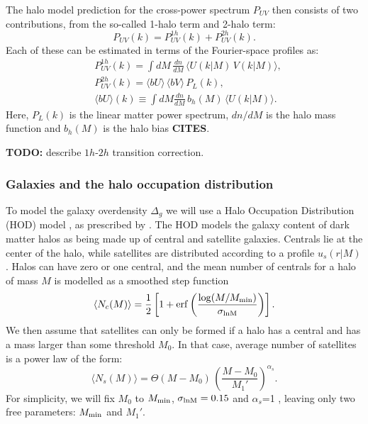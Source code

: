 \documentclass[useAMS,usenatbib]{mn2e}
\newcommand{\cites}{{\bf CITES}}
\newcommand{\todo}[1]{{\bf TODO:} #1}
\begin{document}
    The halo model prediction for the cross-power spectrum $P_{UV}$ then consists of two contributions, from the so-called 1-halo term and 2-halo term:
    \begin{equation}
      P_{UV}(k)=P^{1h}_{UV}(k)+P^{2h}_{UV}(k).
    \end{equation}
    Each of these can be estimated in terms of the Fourier-space profiles as:
    \begin{align}
      &P^{1h}_{UV}(k)=\int dM\,\frac{dn}{dM}\,\langle U(k|M)\,V(k|M)\rangle,\\
      &P^{2h}_{UV}(k)=\langle bU\rangle\,\langle bV\rangle\,P_L(k),\\
      &\langle bU\rangle(k)\equiv\int dM\frac{dn}{dM}\,b_h(M)\,\langle U(k|M)\rangle. \label{eq:hm_bias}
    \end{align}
    Here, $P_L(k)$ is the linear matter power spectrum, $dn/dM$ is the halo mass function and $b_h(M)$ is the halo bias \cites. %
    
    \todo{describe $1h$-$2h$ transition correction.}
    
    \subsubsection{Galaxies and the halo occupation distribution}\label{sssec:theory.hm.hod}
      To model the galaxy overdensity $\Delta_g$ we will use a Halo Occupation Distribution (HOD) model \cite{2002ApJ...575..587B,2005ApJ...633..791Z,2013MNRAS.430..725V}, as prescribed by \cite{2011ApJ...736...59Z}. The HOD models the galaxy content of dark matter halos as being made up of central and satellite galaxies. Centrals lie at the center of the halo, while satellites are distributed according to a profile $u_s(r|M)$. Halos can have zero or one central, and the mean number of centrals for a halo of mass $M$ is modelled as a smoothed step function
      \begin{equation}
        \langle N_c(M)\rangle=\frac{1}{2}\left[1+{\rm erf}\left(\frac{\log(M/M_{\rm min})}{\sigma_{\rm lnM}}\right)\right].
      \end{equation}
      We then assume that satellites can only be formed if a halo has a central and has a mass larger than some threshold $M_0$. In that case, average number of satellites is a power law of the form:
      \begin{equation}
        \langle N_s(M)\rangle=\Theta(M-M_0)\,\left(\frac{M-M_0}{M_1'}\right)^{\alpha_s}.
      \end{equation}
      For simplicity, we will fix $M_0$ to $M_{\rm min}$, $\sigma_{\rm lnM}=0.15$ and $\alpha_s$=1 \cite{2018MNRAS.473.4318A}, leaving only two free parameters: $M_{\rm min}$ and $M_1'$.
      
\end{document}
